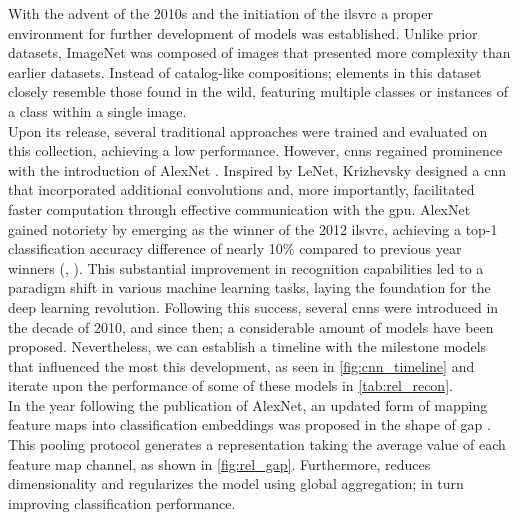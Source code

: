 \noindent With the advent of the 2010s and the initiation of the \gls{ilsvrc} \autocite{ILSVRC15} 
a proper environment for further development of models was established. Unlike prior datasets, 
ImageNet was composed of images that presented more complexity than earlier datasets. Instead 
of catalog-like compositions; elements in this dataset closely resemble those found 
in the wild, featuring multiple classes or instances of a class within a single image.\\

\noindent Upon its release, several traditional approaches were trained and evaluated on this 
collection, achieving a low performance. However, \glspl{cnn} regained prominence with the 
introduction of AlexNet \autocite{krizhevsky2012imagenet}. Inspired by LeNet, Krizhevsky designed a 
\gls{cnn} that incorporated additional convolutions and, more importantly, facilitated faster 
computation through effective communication with the \gls{gpu}.
AlexNet gained notoriety by emerging as the winner of the 2012 \gls{ilsvrc}, achieving a top-1 
classification accuracy difference of nearly 10\% compared to previous year winners 
(\cite{berg2010large}, \cite{sanchez2011high}). This substantial improvement in recognition 
capabilities led to a paradigm shift in various machine learning tasks, laying the foundation 
for the deep learning revolution.
Following this success, several \glspl{cnn} were introduced in the decade of 2010, and since then;
a considerable amount of models have been proposed. Nevertheless, we can establish a timeline with the 
milestone models that influenced the most this development, as seen in \autoref{fig:cnn_timeline}
and iterate upon the performance of some of these models in \autoref{tab:rel_recon}.\\



\noindent In the year following the publication of AlexNet, an updated form of mapping feature maps 
into classification embeddings was proposed  in the shape of \gls{gap} \autocite{lin2013network}. 
This pooling protocol generates a representation taking the average value of each feature map 
channel, as shown in \autoref{fig:rel_gap}. Furthermore, \gap reduces dimensionality and regularizes 
the model using global aggregation; in turn improving classification performance.\\ 


